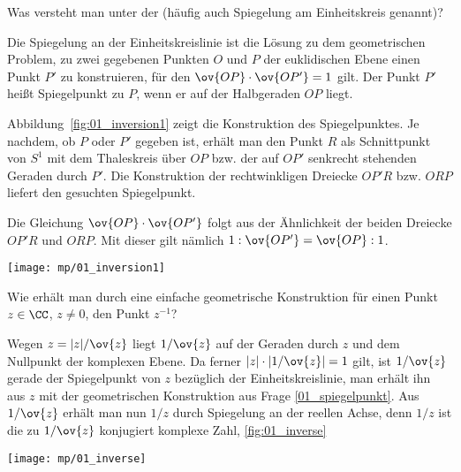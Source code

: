 \begin{frage}\label{01_spiegelpunkt}
  Was versteht man unter der  
  (häufig auch Spiegelung am Einheitskreis genannt)?
\end{frage}

\begin{antwort}[]
  \Ant Die Spiegelung an der Einheitskreislinie ist die Lösung 
  zu dem geometrischen Problem, zu zwei gegebenen Punkten 
  $O$ und $P$ der euklidischen Ebene  
  einen Punkt $P'$ zu konstruieren, für den $\ov{OP} \cdot \ov{OP'}=1$ gilt. 
  Der Punkt $P'$ heißt Spiegelpunkt zu $P$, wenn er auf der Halbgeraden 
  $OP$ liegt.

  Abbildung~\ref{fig:01_inversion1} zeigt die Konstruktion des Spiegelpunktes. 
  Je nachdem, ob $P$ oder $P'$ gegeben ist, 
  erhält man den Punkt $R$ als Schnittpunkt 
  von $S^1$ mit dem Thaleskreis über $OP$ bzw. der auf 
  $OP'$ senkrecht stehenden Geraden durch $P'$. 
  Die Konstruktion der rechtwinkligen Dreiecke $OP'R$ bzw. $ORP$ 
  liefert den gesuchten Spiegelpunkt.

  Die Gleichung $\ov{OP}\cdot \ov{OP'}$ folgt aus der Ähnlichkeit der 
  beiden Dreiecke $OP'R$ und $ORP$. 
  Mit dieser gilt nämlich $1:\ov{OP'}=\ov{OP}:1$.
  \AntEnd

  \begin{center}
    \texttt{[image: mp/01\_inversion1]}
    \label{fig:01_inversion1}
  \end{center}

\end{antwort}






\begin{frage}
  Wie erhält man durch eine einfache geometrische Konstruktion 
  für einen Punkt $z\in\CC$, $z\not=0$, den Punkt $z^{-1}$?
\end{frage}


\begin{antwort}[]
  \Ant Wegen $z=|z|/\ov{z}$ liegt $1/ \ov{z}$ auf der Geraden durch $z$ und 
  dem Nullpunkt der komplexen Ebene. Da ferner $|z|\cdot|1/\ov{z}|=1$ gilt, 
  ist $1/\ov{z}$ gerade der Spiegelpunkt von $z$ bezüglich 
  der Einheitskreislinie, man erhält ihn aus $z$ mit der 
  geometrischen Konstruktion aus Frage \ref{01_spiegelpunkt}. 
  Aus $1/\ov{z}$ erhält man nun $1/z$ durch Spiegelung an der reellen 
  Achse, denn $1/z$ ist die zu $1/\ov{z}$ konjugiert komplexe Zahl, 
  \sieheAbbildung\ref{fig:01_inverse}
  \AntEnd

  \begin{center}
    \texttt{[image: mp/01\_inverse]}
    \label{fig:01_inverse}
  \end{center}

\end{antwort}






